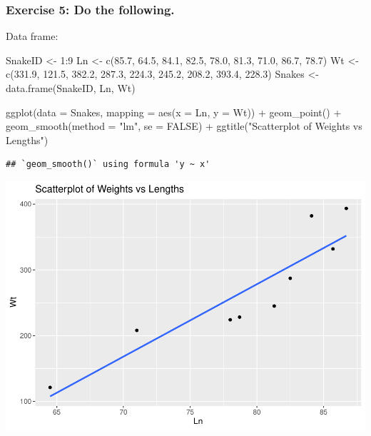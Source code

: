 \documentclass[
]{article}
\newenvironment{Shaded}{\begin{snugshade}}{\end{snugshade}}
\newcommand{\AttributeTok}[1]{\textcolor[rgb]{0.77,0.63,0.00}{#1}}
\newcommand{\ConstantTok}[1]{\textcolor[rgb]{0.00,0.00,0.00}{#1}}
\newcommand{\DecValTok}[1]{\textcolor[rgb]{0.00,0.00,0.81}{#1}}
\newcommand{\FloatTok}[1]{\textcolor[rgb]{0.00,0.00,0.81}{#1}}
\newcommand{\FunctionTok}[1]{\textcolor[rgb]{0.00,0.00,0.00}{#1}}
\newcommand{\NormalTok}[1]{#1}
\newcommand{\OtherTok}[1]{\textcolor[rgb]{0.56,0.35,0.01}{#1}}
\newcommand{\SpecialCharTok}[1]{\textcolor[rgb]{0.00,0.00,0.00}{#1}}
\newcommand{\StringTok}[1]{\textcolor[rgb]{0.31,0.60,0.02}{#1}}
\begin{document}
\hypertarget{exercise-5-do-the-following.}{%
\subsubsection{Exercise 5: Do the
following.}\label{exercise-5-do-the-following.}}

Data frame:

\begin{Shaded}
\begin{Highlighting}[]
\NormalTok{SnakeID }\OtherTok{\textless{}{-}} \DecValTok{1}\SpecialCharTok{:}\DecValTok{9}
\NormalTok{Ln }\OtherTok{\textless{}{-}} \FunctionTok{c}\NormalTok{(}\FloatTok{85.7}\NormalTok{, }\FloatTok{64.5}\NormalTok{, }\FloatTok{84.1}\NormalTok{, }\FloatTok{82.5}\NormalTok{, }\FloatTok{78.0}\NormalTok{, }\FloatTok{81.3}\NormalTok{, }\FloatTok{71.0}\NormalTok{, }\FloatTok{86.7}\NormalTok{, }\FloatTok{78.7}\NormalTok{)}
\NormalTok{Wt }\OtherTok{\textless{}{-}}
  \FunctionTok{c}\NormalTok{(}\FloatTok{331.9}\NormalTok{, }\FloatTok{121.5}\NormalTok{, }\FloatTok{382.2}\NormalTok{, }\FloatTok{287.3}\NormalTok{, }\FloatTok{224.3}\NormalTok{, }\FloatTok{245.2}\NormalTok{, }\FloatTok{208.2}\NormalTok{, }\FloatTok{393.4}\NormalTok{, }\FloatTok{228.3}\NormalTok{)}
\NormalTok{Snakes }\OtherTok{\textless{}{-}} \FunctionTok{data.frame}\NormalTok{(SnakeID, Ln, Wt)}

\FunctionTok{ggplot}\NormalTok{(}\AttributeTok{data =}\NormalTok{ Snakes, }\AttributeTok{mapping =} \FunctionTok{aes}\NormalTok{(}\AttributeTok{x =}\NormalTok{ Ln, }\AttributeTok{y =}\NormalTok{ Wt)) }\SpecialCharTok{+}
  \FunctionTok{geom\_point}\NormalTok{() }\SpecialCharTok{+}
  \FunctionTok{geom\_smooth}\NormalTok{(}\AttributeTok{method =} \StringTok{"lm"}\NormalTok{, }\AttributeTok{se =} \ConstantTok{FALSE}\NormalTok{) }\SpecialCharTok{+}
  \FunctionTok{ggtitle}\NormalTok{(}\StringTok{"Scatterplot of Weights vs Lengths"}\NormalTok{)}
\end{Highlighting}
\end{Shaded}

\begin{verbatim}
## `geom_smooth()` using formula 'y ~ x'
\end{verbatim}

\includegraphics{Class_Exercises_ClassNotes_5_files/figure-latex/unnamed-chunk-18-1.pdf}
\newpage
\end{document}

